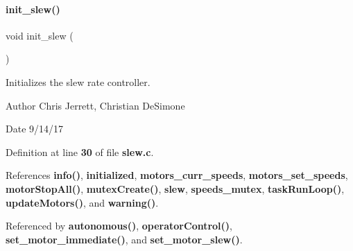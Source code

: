 \paragraph{init\+\_\+slew()}
{\footnotesize\ttfamily void init\+\_\+slew (\begin{DoxyParamCaption}{ }\end{DoxyParamCaption})}



Initializes the slew rate controller. 

\begin{DoxyAuthor}{Author}
Chris Jerrett, Christian De\+Simone 
\end{DoxyAuthor}
\begin{DoxyDate}{Date}
9/14/17 
\end{DoxyDate}


Definition at line \textbf{ 30} of file \textbf{ slew.\+c}.



References \textbf{ info()}, \textbf{ initialized}, \textbf{ motors\+\_\+curr\+\_\+speeds}, \textbf{ motors\+\_\+set\+\_\+speeds}, \textbf{ motor\+Stop\+All()}, \textbf{ mutex\+Create()}, \textbf{ slew}, \textbf{ speeds\+\_\+mutex}, \textbf{ task\+Run\+Loop()}, \textbf{ update\+Motors()}, and \textbf{ warning()}.



Referenced by \textbf{ autonomous()}, \textbf{ operator\+Control()}, \textbf{ set\+\_\+motor\+\_\+immediate()}, and \textbf{ set\+\_\+motor\+\_\+slew()}.


